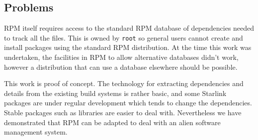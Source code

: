 \subsection{Problems}
RPM itself requires access to the standard RPM database of dependencies
needed to track all the files.  This is owned by {\tt{root}} so general
users cannot create and install packages using the standard RPM
distribution. At the time this work was undertaken, the facilities in
RPM to allow alternative databases didn't work, however a distribution
that can use a database elsewhere should be possible.

This work is proof of concept. The technology for extracting
dependencies and details from the existing build systems is rather
basic, and some Starlink packages are under regular development which
tends to change the dependencies. Stable packages such as libraries are
easier to deal with.  Nevertheless we have demonstrated that RPM can be
adapted to deal with an alien software management system.


